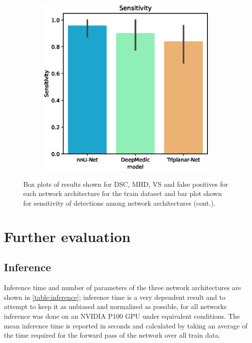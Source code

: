 \begin{figure}
	\ContinuedFloat
	\centering
	\begin{subfigure}{.6\linewidth}
		\includegraphics[width=\linewidth]{figures/Sensitivity.eps}
	\end{subfigure}
	\caption{Box plots of results shown for DSC, MHD, VS and false positives for each network architecture for the train dataset and bar plot shown for sensitivity of detections among network architectures (cont.).}
	\label{fig:results_cont_cont}
\end{figure}

\section{Further evaluation}

\subsection{Inference}
Inference time and number of parameters of the three network architectures are shown in \ref{table:inference}; inference time is a very dependent result and to attempt to keep it as unbiased and normalized as possible, for all networks inference was done on an NVIDIA P100 GPU under equivalent conditions. The mean inference time is reported in seconds and calculated by taking an average of the time required for the forward pass of the network over all train data.

